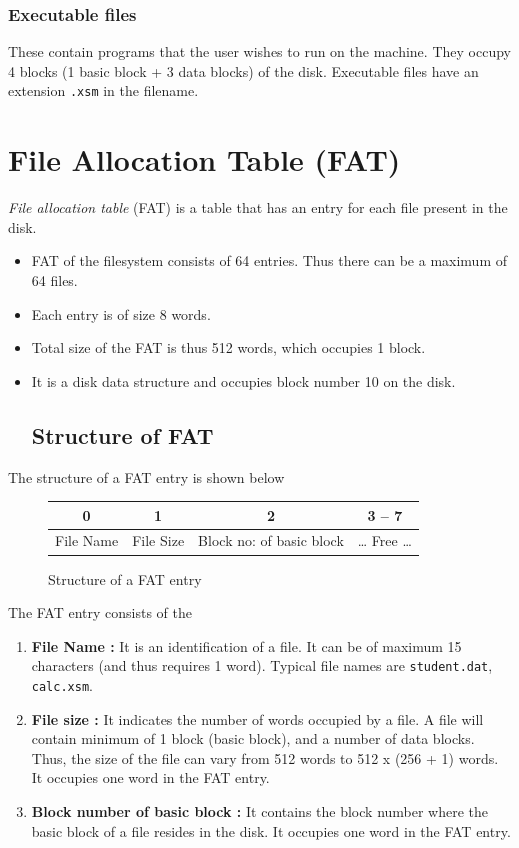\documentclass[11pt]{article}
\begin{document}
\subsubsection{Executable files}  These contain programs that the user wishes to run on the machine. They occupy 4 blocks (1 basic block + 3 data blocks) of the disk. Executable files have an extension \texttt{.xsm} in the filename.


\section{File Allocation Table (FAT)}
\label{sec:fat}
\label{lbl:fat}
\emph{File allocation table} (FAT) is a table that has an entry for each file present in the disk.

\begin{itemize}
	\item FAT of the filesystem consists of 64 entries. Thus there can be a maximum of 64 files. 
	\item Each entry is of size 8 words.
	\item Total size of the FAT is thus 512 words, which occupies 1 block.
	\item It is a disk data structure and occupies block number 10 on the disk.

\subsection{Structure of FAT}
\end{itemize}

The structure of a FAT entry is shown below 

\begin{figure}[htp!] \small
	\centering
	\begin{tabular}{|c|c|c|c|}
		\hline
		0 & 1 & 2 & 3 -- 7 \\
		\hline
		File Name & File Size & Block no: of basic block & \dots{} Free \dots \\
		\hline
	\end{tabular}
	\caption{Structure of a FAT entry}
	\label{fig:fat_entry}
\end{figure}

The FAT entry consists of the
\begin{enumerate}
	\item \textbf{File Name :} It is an identification of a file. It can be of maximum 15 characters (and thus requires 1 word). Typical file names are \texttt{student.dat}, \texttt{calc.xsm}.
	\item \textbf{File size :} It indicates the number of words occupied by a file. A file will contain minimum of 1 block (basic block), and a number of data blocks. Thus, the size of the file can vary from 512 words to 512 x (256 + 1) words. It occupies one word in the FAT entry.
	\item \textbf{Block number of basic block :} It contains the block number where the basic block of a file resides in the disk. It occupies one word in the FAT entry.
\end{enumerate}
\end{document}
